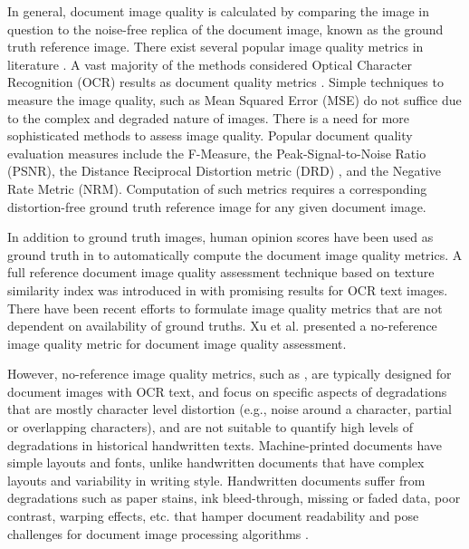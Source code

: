 \documentclass[10pt, a4paper, conference, compsocconf]{IEEEtran}
\begin{document}
In general, document image quality is calculated by comparing the image in question to the noise-free replica of the document image, known as the ground truth reference image. There exist several popular image quality metrics in literature \cite{ye2013document}. A vast majority of the methods considered Optical Character Recognition (OCR) results as document quality metrics \cite{hale2007human, kang2014deep, nayef2015metric}. Simple techniques to measure the image quality, such as Mean Squared Error (MSE) do not suffice due to the complex and degraded nature of images. There is a need for more sophisticated methods to assess image quality. Popular document quality evaluation measures \cite{gatos2009icdar,
pratikakis2016icfhr2016} include the F-Measure, the Peak-Signal-to-Noise Ratio (PSNR), the Distance Reciprocal Distortion metric (DRD) \cite{lu2004distance}, and the Negative Rate Metric (NRM). Computation of such metrics requires a corresponding distortion-free ground truth reference image for any given document image. 

In addition to ground truth images, human opinion scores have been used as ground truth in \cite{lu2004distance,obafemi2012character,kumar2012sharpness,alaei2015document} to automatically compute the document image quality metrics. A full reference document image quality assessment technique based on texture similarity index was introduced in \cite{alaei2016document} with promising results for OCR text images. There have been recent efforts to formulate image quality metrics that are not dependent on availability of ground truths. Xu et al. \cite{xu2016no} presented a no-reference image quality metric for document image quality assessment.

However, no-reference image quality metrics, such as \cite{xu2016no}, are typically designed for document images with OCR text, and focus on specific aspects of degradations that are mostly character level distortion (e.g., noise around a character, partial or overlapping characters), and are not suitable to quantify high levels of degradations in historical handwritten texts. Machine-printed documents have simple layouts and fonts, unlike handwritten documents that have complex layouts and variability in writing style. Handwritten documents suffer from degradations such as paper stains, ink bleed-through, missing or faded data, poor contrast, warping effects, etc. that hamper document readability and pose challenges for document image processing algorithms \cite{giotis2017survey}.
\end{document}
